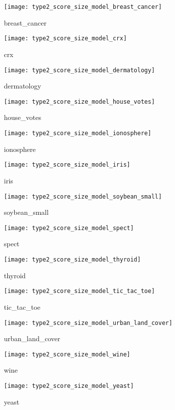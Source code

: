 \begin{figure}[H]\texttt{[image: type2\_score\_size\_model\_breast\_cancer]}\centering\caption{breast\_cancer}\end{figure}
\begin{figure}[H]\texttt{[image: type2\_score\_size\_model\_crx]}\centering\caption{crx}\end{figure}
\begin{figure}[H]\texttt{[image: type2\_score\_size\_model\_dermatology]}\centering\caption{dermatology}\end{figure}
\begin{figure}[H]\texttt{[image: type2\_score\_size\_model\_house\_votes]}\centering\caption{house\_votes}\end{figure}
\begin{figure}[H]\texttt{[image: type2\_score\_size\_model\_ionosphere]}\centering\caption{ionosphere}\end{figure}
\begin{figure}[H]\texttt{[image: type2\_score\_size\_model\_iris]}\centering\caption{iris}\end{figure}
\begin{figure}[H]\texttt{[image: type2\_score\_size\_model\_soybean\_small]}\centering\caption{soybean\_small}\end{figure}
\begin{figure}[H]\texttt{[image: type2\_score\_size\_model\_spect]}\centering\caption{spect}\end{figure}
\begin{figure}[H]\texttt{[image: type2\_score\_size\_model\_thyroid]}\centering\caption{thyroid}\end{figure}
\begin{figure}[H]\texttt{[image: type2\_score\_size\_model\_tic\_tac\_toe]}\centering\caption{tic\_tac\_toe}\end{figure}
\begin{figure}[H]\texttt{[image: type2\_score\_size\_model\_urban\_land\_cover]}\centering\caption{urban\_land\_cover}\end{figure}
\begin{figure}[H]\texttt{[image: type2\_score\_size\_model\_wine]}\centering\caption{wine}\end{figure}
\begin{figure}[H]\texttt{[image: type2\_score\_size\_model\_yeast]}\centering\caption{yeast}\end{figure}

